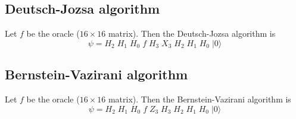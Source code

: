 \documentclass[12pt]{article}
\begin{document}
\subsection*{Deutsch-Jozsa algorithm}
Let $f$ be the oracle ($16\times16$ matrix).
Then the Deutsch-Jozsa algorithm is
\begin{equation*}
\psi = H_2 \; H_1 \; H_0 \; f \; H_3 \; X_3 \; H_2 \; H_1 \; H_0 \; |0\rangle
\end{equation*}

\subsection*{Bernstein-Vazirani algorithm}
Let $f$ be the oracle ($16\times16$ matrix).
Then the Bernstein-Vazirani algorithm is
\begin{equation*}
\psi = H_2 \; H_1 \; H_0 \; f \; Z_3 \; H_3 \; H_2 \; H_1 \; H_0 \; |0\rangle
\end{equation*}
\end{document}
